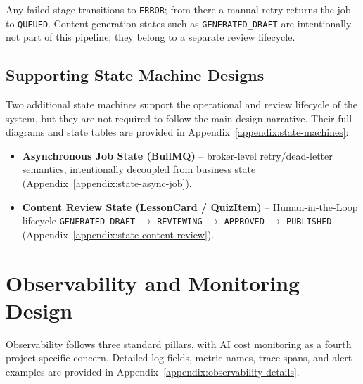 Any failed stage transitions to \texttt{ERROR}; from there a manual
retry returns the job to \texttt{QUEUED}. Content-generation states
such as \texttt{GENERATED\_DRAFT} are intentionally not part of this
pipeline; they belong to a separate review lifecycle.

\subsection{Supporting State Machine Designs}
\label{subsec:other-state-machines}

Two additional state machines support the operational and review
lifecycle of the system, but they are not required to follow the main
design narrative. Their full diagrams and state tables are provided in
Appendix~\ref{appendix:state-machines}:

\begin{itemize}
    \item \textbf{Asynchronous Job State (BullMQ)} -- broker-level
          retry/dead-letter semantics, intentionally decoupled from
          business state
          (Appendix~\ref{appendix:state-async-job}).
    \item \textbf{Content Review State (LessonCard / QuizItem)} --
          Human-in-the-Loop lifecycle
          \texttt{GENERATED\_DRAFT} $\to$ \texttt{REVIEWING} $\to$
          \texttt{APPROVED} $\to$ \texttt{PUBLISHED}
          (Appendix~\ref{appendix:state-content-review}).
\end{itemize}

\section{Observability and Monitoring Design}
\label{sec:observability-monitoring-design}

Observability follows three standard pillars, with AI cost monitoring as
a fourth project-specific concern. Detailed log fields, metric names,
trace spans, and alert examples are provided in
Appendix~\ref{appendix:observability-details}.

